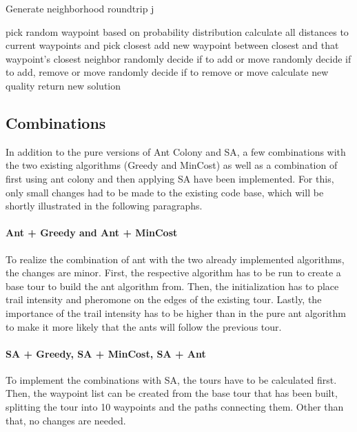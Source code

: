 \begin{breakablealgorithm}
	\caption{Generate neighborhood roundtrip j}
	\label{alg:SAGenerateNeigborhood}
	\begin{algorithmic}[1]
		\STATE pick random waypoint based on probability distribution
		\STATE calculate all distances to current waypoints and pick closest
		\STATE add new waypoint between closest and that waypoint's closest neighbor
		\ELSE {}
		\STATE randomly decide if to add or move
		\ELSE {}
		\STATE randomly decide if to add, remove or move
		\ELSE 
		\STATE randomly decide if to remove or move
		\ENDIF
		\ENDIF
		\ENDIF
		\STATE calculate new quality
		\STATE return new solution
	\end{algorithmic}
\end{breakablealgorithm}


\subsection{Combinations}
\label{subsec:algoCombinations}

In addition to the pure versions of Ant Colony and SA, a few combinations with the two existing algorithms (Greedy and MinCost) as well as a combination of first using ant colony and then applying SA have been implemented.
For this, only small changes had to be made to the existing code base, which will be shortly illustrated in the following paragraphs.

\paragraph{Ant + Greedy and Ant + MinCost}

To realize the combination of ant with the two already implemented algorithms, the changes are minor.
First, the respective algorithm has to be run to create a base tour to build the ant algorithm from.
Then, the initialization has to place trail intensity and pheromone on the edges of the existing tour.
Lastly, the importance of the trail intensity has to be higher than in the pure ant algorithm to make it more likely that the ants will follow the previous tour.


\paragraph{SA + Greedy, SA + MinCost, SA + Ant}

To implement the combinations with SA, the tours have to be calculated first.
Then, the waypoint list can be created from the base tour that has been built, splitting the tour into 10 waypoints and the paths connecting them. 
Other than that, no changes are needed.

